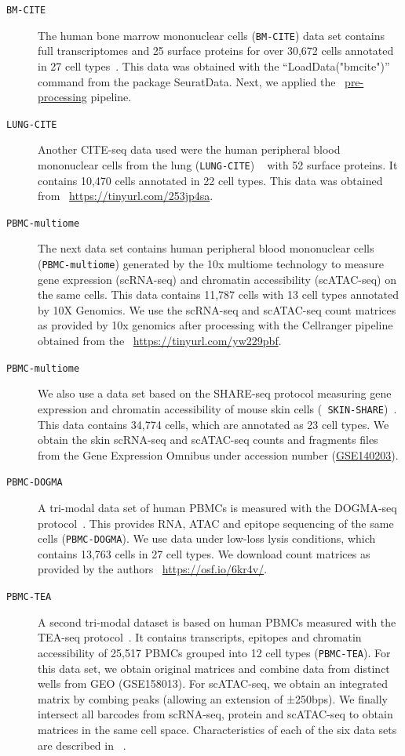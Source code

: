 \begin{description}
	\item[{\texttt{BM-CITE}}]
	The human bone marrow mononuclear cells ({\texttt{BM-CITE}}) data set contains full transcriptomes and 25 surface proteins for over 30,672 cells annotated in 27 cell types~\citep{hao2021seurat4}. This data was obtained with the ``LoadData("bmcite")'' command from the package SeuratData. Next, we applied the ~\hyperref[sec:preproccessing]{pre-processing} pipeline.	

	\item[{\texttt{LUNG-CITE}}]
	Another CITE-seq data used were the human peripheral blood mononuclear cells from the lung ({\texttt{LUNG-CITE}}) ~\citep{buus2021improving} with 52 surface proteins. It contains 10,470 cells annotated in 22 cell types. This data was obtained from ~\url{https://tinyurl.com/253jp4sa}.

	\item[{\texttt{PBMC-multiome}}]
  	The next data set contains human peripheral blood mononuclear cells ({\texttt{PBMC-multiome}}) generated by the 10x multiome technology to measure gene expression (scRNA-seq) and chromatin accessibility (scATAC-seq) on the same cells. This data contains 11,787 cells with 13 cell types annotated by 10X Genomics.  We use the scRNA-seq and scATAC-seq count matrices as provided by 10x genomics after processing with the Cellranger pipeline obtained from the ~\url{https://tinyurl.com/yw229pbf}.

	\item[{\texttt{PBMC-multiome}}]
	We also use a data set based on the SHARE-seq protocol measuring gene expression and chromatin accessibility of mouse skin cells ({\texttt{ SKIN-SHARE}})~\citep{ma2020chromatin}. This data contains 34,774 cells, which are annotated as 23 cell types. We obtain the skin scRNA-seq and scATAC-seq counts and fragments files from the Gene Expression Omnibus under accession number (\href{https://www.ncbi.nlm.nih.gov/geo/query/acc.cgi?acc=GSE140203}{GSE140203}).

	\item[{\texttt{PBMC-DOGMA}}]
	A tri-modal data set of human PBMCs is measured with the DOGMA-seq protocol~\citep{mimitou2021scalable}. This provides RNA, ATAC and epitope sequencing of the same cells ({\texttt{PBMC-DOGMA}}). We use data under low-loss lysis conditions, which contains 13,763 cells in 27 cell types. We download count matrices as provided by the authors ~\url{https://osf.io/6kr4v/}.

	\item[{\texttt{PBMC-TEA}}]
	A second tri-modal dataset is based on human PBMCs measured with the TEA-seq protocol~\citep{swanson2021simultaneous}. It contains transcripts, epitopes and chromatin accessibility of 25,517 PBMCs grouped into 12 cell types ({\texttt{PBMC-TEA}}). For this data set, we obtain original matrices and combine data from distinct wells from GEO (GSE158013). For scATAC-seq, we obtain an integrated matrix by combing peaks (allowing an extension of ±250bps). We finally intersect all barcodes from scRNA-seq, protein and scATAC-seq to obtain matrices in the same cell space. Characteristics of each of the six data sets are described in ~.



\end{description}
